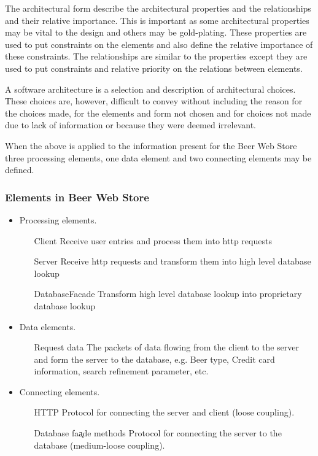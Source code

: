 The architectural form describe the architectural properties and the relationships and their relative importance. This is important as some architectural properties
may be vital to the design and others may be gold-plating. These properties are used to put constraints on the elements and also define the relative importance of these constraints. The relationships are similar to the properties except they are used to put constraints and relative priority on the relations between elements.

A software architecture is a selection and description of architectural choices. These choices are, however, difficult to convey without including the reason for the choices made, for the elements and form not chosen and for choices not made due to lack of information or because they were deemed irrelevant.

When the above is applied to the information present for the Beer Web Store three processing elements, one data element and two connecting elements may be defined.

\subsubsection{Elements in Beer Web Store}

\begin{itemize}
    \item Processing elements.
	 \begin{itemize}
	    \item[Client] Receive user entries and process them into http requests
	    \item[Server] Receive http requests and transform them into high level database lookup
	    \item[DatabaseFacade] Transform high level database lookup into proprietary database lookup
	 \end{itemize}
    \item Data elements.
	 \begin{itemize}
	    \item[Request data] The packets of data flowing from the client to the server and form the server to the database, e.g. Beer type, Credit card information, search refinement parameter, etc.
	 \end{itemize}
    \item Connecting elements.
	 \begin{itemize}
	    \item[HTTP] Protocol for connecting the server and client (loose coupling).
	    \item[Database fa\c ade methods] Protocol for connecting the server to the database (medium-loose coupling).
	 \end{itemize}
\end{itemize}

